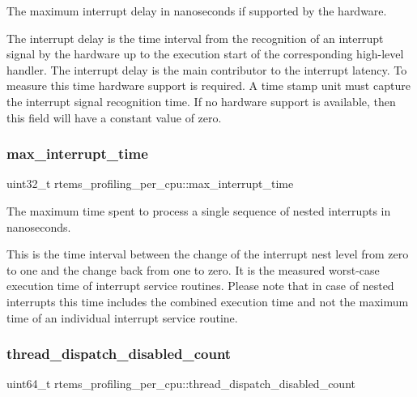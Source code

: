 The maximum interrupt delay in nanoseconds if supported by the hardware. 

The interrupt delay is the time interval from the recognition of an interrupt signal by the hardware up to the execution start of the corresponding high-\/level handler. The interrupt delay is the main contributor to the interrupt latency. To measure this time hardware support is required. A time stamp unit must capture the interrupt signal recognition time. If no hardware support is available, then this field will have a constant value of zero. \mbox{\label{structrtems__profiling__per__cpu_a12f3c2b20ade7916dd9278c445805826}} 
\subsubsection{\texorpdfstring{max\_interrupt\_time}{max\_interrupt\_time}}
{\footnotesize\ttfamily uint32\+\_\+t rtems\+\_\+profiling\+\_\+per\+\_\+cpu\+::max\+\_\+interrupt\+\_\+time}



The maximum time spent to process a single sequence of nested interrupts in nanoseconds. 

This is the time interval between the change of the interrupt nest level from zero to one and the change back from one to zero. It is the measured worst-\/case execution time of interrupt service routines. Please note that in case of nested interrupts this time includes the combined execution time and not the maximum time of an individual interrupt service routine. \mbox{\label{structrtems__profiling__per__cpu_ad5ffd37b33203299ff1f2933931189b7}} 
\subsubsection{\texorpdfstring{thread\_dispatch\_disabled\_count}{thread\_dispatch\_disabled\_count}}
{\footnotesize\ttfamily uint64\+\_\+t rtems\+\_\+profiling\+\_\+per\+\_\+cpu\+::thread\+\_\+dispatch\+\_\+disabled\+\_\+count}



